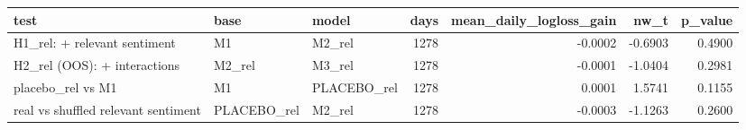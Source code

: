 \begin{tabular}{lllrrrr}
\toprule
test & base & model & days & mean\_daily\_logloss\_gain & nw\_t & p\_value \\
\midrule
H1\_rel: + relevant sentiment & M1 & M2\_rel & 1278 & -0.0002 & -0.6903 & 0.4900 \\
H2\_rel (OOS): + interactions & M2\_rel & M3\_rel & 1278 & -0.0001 & -1.0404 & 0.2981 \\
placebo\_rel vs M1 & M1 & PLACEBO\_rel & 1278 & 0.0001 & 1.5741 & 0.1155 \\
real vs shuffled relevant sentiment & PLACEBO\_rel & M2\_rel & 1278 & -0.0003 & -1.1263 & 0.2600 \\
\bottomrule
\end{tabular}
